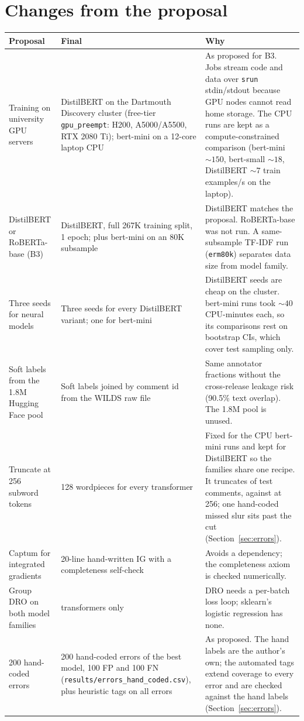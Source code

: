 \section{Changes from the proposal}
\label{app:changes}
\begin{center}\small
\begin{tabular}{p{}p{}p{}}\toprule
Proposal & Final & Why \\\midrule
Training on university GPU servers & DistilBERT on the Dartmouth Discovery cluster (free-tier \texttt{gpu\_preempt}: H200, A5000/A5500, RTX 2080 Ti); bert-mini on a 12-core laptop CPU & As proposed for B3. Jobs stream code and data over \texttt{srun} stdin/stdout because GPU nodes cannot read home storage. The CPU runs are kept as a compute-constrained comparison (bert-mini ${\sim}150$, bert-small ${\sim}18$, DistilBERT ${\sim}7$ train examples/s on the laptop). \\
DistilBERT or RoBERTa-base (B3) & DistilBERT, full 267K training split, 1 epoch; plus bert-mini on an 80K subsample & DistilBERT matches the proposal. RoBERTa-base was not run. A same-subsample TF-IDF run (\texttt{erm80k}) separates data size from model family. \\
Three seeds for neural models & Three seeds for every DistilBERT variant; one for bert-mini & DistilBERT seeds are cheap on the cluster. bert-mini runs took ${\sim}40$ CPU-minutes each, so its comparisons rest on bootstrap CIs, which cover test sampling only. \\
Soft labels from the 1.8M Hugging Face pool & Soft labels joined by comment id from the WILDS raw file & Same annotator fractions without the cross-release leakage risk (90.5\% text overlap). The 1.8M pool is unused. \\
Truncate at 256 subword tokens & 128 wordpieces for every transformer & Fixed for the CPU bert-mini runs and kept for DistilBERT so the families share one recipe. It truncates \TokOverOneTwoEight{} of test comments, against \TokOverTwoFiveSix{} at 256; one hand-coded missed slur sits past the cut (Section~\ref{sec:errors}). \\
Captum for integrated gradients & 20-line hand-written IG with a completeness self-check & Avoids a dependency; the completeness axiom is checked numerically. \\
Group DRO on both model families & transformers only & DRO needs a per-batch loss loop; sklearn's logistic regression has none. \\
200 hand-coded errors & 200 hand-coded errors of the best model, 100 FP and 100 FN (\texttt{results/}\allowbreak\texttt{errors\_hand\_coded.csv}), plus heuristic tags on all errors & As proposed. The hand labels are the author's own; the automated tags extend coverage to every error and are checked against the hand labels (Section~\ref{sec:errors}). \\
\bottomrule\end{tabular}
\end{center}

